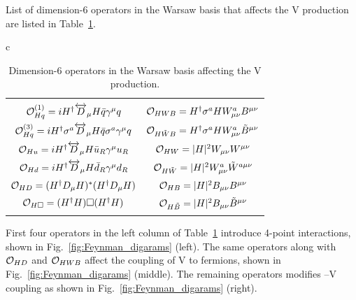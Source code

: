 \documentclass[a4paper,11pt]{article}
\renewcommand{\PV}{{{{V}}}\xspace}
\newcommand{\VH}{{{\PV}{\PH}}\xspace}
\begin{document}
List of dimension-6 operators in the Warsaw basis that affects the \VH production are listed in Table~\ref{Tab:Operators}.
\begin{table}[hbtp]
\small
\centering
\caption{
Dimension-6 operators in the Warsaw basis affecting the \VH production. %
}
\begin{tabular}{c}
\begin{tabular}{c|c}
&\\
                ${\cal O}^{(1)}_{Hq}=i H^\dagger  \overleftrightarrow{D}_\mu H \bar{q}   \gamma^\mu q$&${\cal O}_{HWB}=  H^\dagger \sigma^a H W^a_{\mu\nu}B^{\mu\nu}$ \\
\rule{0pt}{4ex} ${\cal O}^{(3)}_{Hq}=i H^\dagger \sigma^a \overleftrightarrow{D}_\mu H \bar{q}  \sigma^a \gamma^\mu q$ &${\cal O}_{H\tilde{W}B}=  H^\dagger \sigma^a H W^a_{\mu\nu}\tilde{B}^{\mu\nu}$\\
\rule{0pt}{4ex} ${\cal O}_{Hu}=i H^\dagger \overleftrightarrow{D}_\mu H \bar{u}_R  \gamma^\mu u_R$&${\cal O}_{H{W}}= |H|^2 W_{\mu\nu}{W}^{\mu\nu}$\\
\rule{0pt}{4ex} ${\cal O}_{Hd}=i H^\dagger \overleftrightarrow{D}_\mu H \bar{d}_R  \gamma^\mu d_R$&${\cal O}_{H\tilde{W}}= |H|^2 W^a_{\mu\nu}\tilde{W}^{a \mu\nu}$\\
\rule{0pt}{4ex} ${\cal O}_{HD}=(H^\dagger  {D}_\mu H)^*(H^\dagger  {D}_\mu H)$& ${\cal O}_{HB}= |H|^2 B_{\mu\nu}B^{\mu\nu}$\\
\rule{0pt}{4ex} ${\cal O}_{H\square}=(H^\dagger H) \square (H^\dagger H)$& ${\cal O}_{H\tilde{B}}= |H|^2 B_{\mu\nu}\tilde{B}^{\mu\nu}$\\
&\\
 \end{tabular}
\end{tabular}
\label{Tab:Operators}
\end{table}
First four operators in the left column of Table~\ref{Tab:Operators} introduce 4-point interactions, shown in Fig.~\ref{fig:Feynman_digarams} (left). 
The same operators along with ${\cal O}_{HD}$ and ${\cal O}_{HWB}$ affect the coupling of \PV to fermions, shown in Fig.~\ref{fig:Feynman_digarams} (middle). 
The remaining operators modifies \PH--\PV coupling as shown in Fig.~\ref{fig:Feynman_digarams} (right). 
\end{document}
